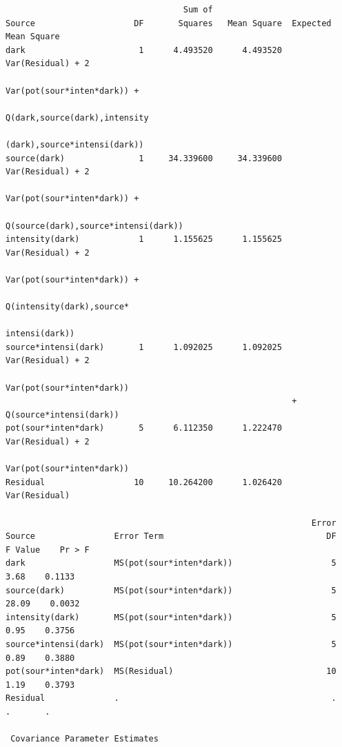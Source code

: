 \begin{LARGE}
\begin{small}
\begin{verbatim}
                                    Sum of
Source                    DF       Squares   Mean Square  Expected Mean Square
dark                       1      4.493520      4.493520  Var(Residual) + 2                    
                                                          Var(pot(sour*inten*dark)) +          
                                                          Q(dark,source(dark),intensity        
                                                          (dark),source*intensi(dark))         
source(dark)               1     34.339600     34.339600  Var(Residual) + 2                    
                                                          Var(pot(sour*inten*dark)) +          
                                                          Q(source(dark),source*intensi(dark)) 
intensity(dark)            1      1.155625      1.155625  Var(Residual) + 2                    
                                                          Var(pot(sour*inten*dark)) +          
                                                          Q(intensity(dark),source*            
                                                          intensi(dark))                       
source*intensi(dark)       1      1.092025      1.092025  Var(Residual) + 2                    
                                                          Var(pot(sour*inten*dark))            
                                                          + Q(source*intensi(dark))            
pot(sour*inten*dark)       5      6.112350      1.222470  Var(Residual) + 2                    
                                                          Var(pot(sour*inten*dark))            
Residual                  10     10.264200      1.026420  Var(Residual)                        

                                                              Error
Source                Error Term                                 DF    F Value    Pr > F
dark                  MS(pot(sour*inten*dark))                    5       3.68    0.1133
source(dark)          MS(pot(sour*inten*dark))                    5      28.09    0.0032
intensity(dark)       MS(pot(sour*inten*dark))                    5       0.95    0.3756
source*intensi(dark)  MS(pot(sour*inten*dark))                    5       0.89    0.3880
pot(sour*inten*dark)  MS(Residual)                               10       1.19    0.3793
Residual              .                                           .        .       .    

 Covariance Parameter Estimates
 

\end{verbatim}
\end{small}
\end{LARGE}

